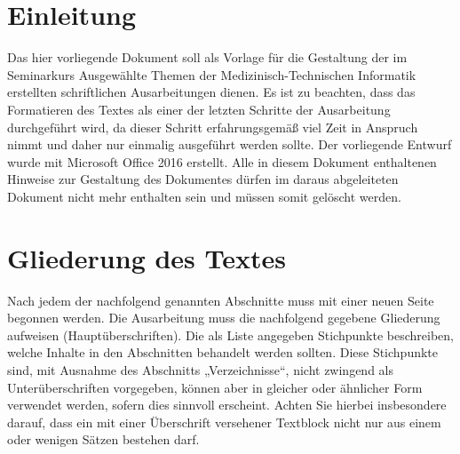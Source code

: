 

\newpage
\chapter{Einleitung}
Das hier vorliegende Dokument soll als Vorlage für die Gestaltung der im Seminarkurs Ausgewählte Themen der Medizinisch-Technischen Informatik erstellten schriftlichen Ausarbeitungen dienen.
Es ist zu beachten, dass das Formatieren des Textes als einer der letzten Schritte der Ausarbeitung durchgeführt wird, da dieser Schritt erfahrungsgemäß viel Zeit in Anspruch nimmt und daher nur einmalig ausgeführt werden sollte.
Der vorliegende Entwurf wurde mit Microsoft Office 2016 erstellt.
Alle in diesem Dokument enthaltenen Hinweise zur Gestaltung des Dokumentes dürfen im daraus abgeleiteten Dokument nicht mehr enthalten sein und müssen somit gelöscht werden.

\chapter{Gliederung des Textes}
Nach jedem der nachfolgend genannten Abschnitte muss mit einer neuen Seite begonnen werden. Die Ausarbeitung muss die nachfolgend gegebene Gliederung aufweisen (Hauptüberschriften).
Die als Liste angegeben Stichpunkte beschreiben, welche Inhalte in den Abschnitten behandelt werden sollten. Diese Stichpunkte sind, mit Ausnahme des Abschnitts „Verzeichnisse“, nicht zwingend als Unterüberschriften vorgegeben, können aber in gleicher oder ähnlicher Form verwendet werden, sofern dies sinnvoll erscheint. Achten Sie hierbei insbesondere darauf, dass ein mit einer Überschrift versehener Textblock nicht nur aus einem oder wenigen Sätzen bestehen darf.

